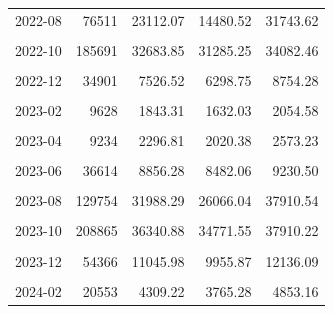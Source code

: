 \begin{longtable}[t]{crrrr}
2022-08 & 76511 & 23112.07 & 14480.52 & 31743.62\\
\cellcolor{gray!10}{2022-09} & \cellcolor{gray!10}{294680} & \cellcolor{gray!10}{58561.58} & \cellcolor{gray!10}{55550.67} & \cellcolor{gray!10}{61572.49}\\
2022-10 & 185691 & 32683.85 & 31285.25 & 34082.46\\
\cellcolor{gray!10}{2022-11} & \cellcolor{gray!10}{91955} & \cellcolor{gray!10}{18991.00} & \cellcolor{gray!10}{17257.50} & \cellcolor{gray!10}{20724.51}\\
2022-12 & 34901 & 7526.52 & 6298.75 & 8754.28\\
\cellcolor{gray!10}{2023-01} & \cellcolor{gray!10}{13055} & \cellcolor{gray!10}{2676.93} & \cellcolor{gray!10}{2199.97} & \cellcolor{gray!10}{3153.88}\\
2023-02 & 9628 & 1843.31 & 1632.03 & 2054.58\\
\cellcolor{gray!10}{2023-03} & \cellcolor{gray!10}{10351} & \cellcolor{gray!10}{2535.45} & \cellcolor{gray!10}{2217.31} & \cellcolor{gray!10}{2853.60}\\
2023-04 & 9234 & 2296.81 & 2020.38 & 2573.23\\
\cellcolor{gray!10}{2023-05} & \cellcolor{gray!10}{20327} & \cellcolor{gray!10}{5089.32} & \cellcolor{gray!10}{4708.16} & \cellcolor{gray!10}{5470.47}\\
2023-06 & 36614 & 8856.28 & 8482.06 & 9230.50\\
\cellcolor{gray!10}{2023-07} & \cellcolor{gray!10}{57487} & \cellcolor{gray!10}{14205.16} & \cellcolor{gray!10}{12031.36} & \cellcolor{gray!10}{16378.95}\\
2023-08 & 129754 & 31988.29 & 26066.04 & 37910.54\\
\cellcolor{gray!10}{2023-09} & \cellcolor{gray!10}{228974} & \cellcolor{gray!10}{44920.01} & \cellcolor{gray!10}{41579.55} & \cellcolor{gray!10}{48260.47}\\
2023-10 & 208865 & 36340.88 & 34771.55 & 37910.22\\
\cellcolor{gray!10}{2023-11} & \cellcolor{gray!10}{145959} & \cellcolor{gray!10}{26932.68} & \cellcolor{gray!10}{22788.61} & \cellcolor{gray!10}{31076.75}\\
2023-12 & 54366 & 11045.98 & 9955.87 & 12136.09\\
\cellcolor{gray!10}{2024-01} & \cellcolor{gray!10}{22910} & \cellcolor{gray!10}{4024.53} & \cellcolor{gray!10}{3497.23} & \cellcolor{gray!10}{4551.83}\\
2024-02 & 20553 & 4309.22 & 3765.28 & 4853.16\\

\end{longtable}
